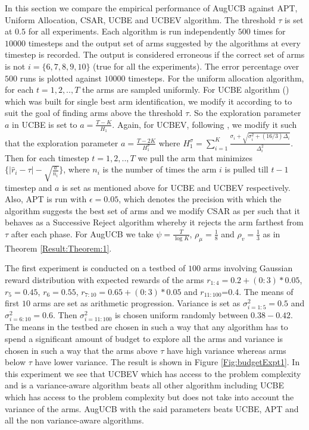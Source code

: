 	In this section we compare the empirical performance of AugUCB against APT, Uniform Allocation, CSAR, UCBE and UCBEV algorithm. The threshold $\tau$ is set at $0.5$ for all experiments. Each algorithm is run independently $500$ times for $10000$ timesteps and the output set of arms suggested by the algorithms at every timestep is recorded. The output is considered erroneous if the correct set of arms is not $i=\lbrace 6,7,8,9,10 \rbrace$ (true for all the experiments). The error percentage over $500$ runs is plotted against $10000$ timesteps. For the uniform allocation algorithm, for each $t=1,2,..,T$ the arms are sampled uniformly. For UCBE algorithm (\cite{audibert2009exploration}) which was built for single best arm identification, we modify it according to \cite{locatelli2016optimal} to suit the goal of finding arms above the threshold $\tau$. So the exploration parameter $a$ in UCBE is set to $a=\frac{T-K}{H_1}$. Again, for UCBEV, following \cite{gabillon2011multi}, we modify it such that the exploration parameter $a = \frac{T-2K}{H_{1}^{\sigma}}$ where $H_{1}^{\sigma}=\sum_{i=1}^{K}\frac{\sigma_{i}+\sqrt{\sigma_{i}^{2}+(16/3)\Delta_{i}}}{\Delta_{i}^{2}}$. Then for each timestep $t=1,2,..,T$ we pull the arm that minimizes $\lbrace |\hat{r}_{i} -\tau|-\sqrt{\frac{a}{n_{i}}} \rbrace$, where $n_{i}$ is the number of times the arm $i$ is pulled till $t-1$ timestep and $a$ is set as mentioned above for UCBE and UCBEV respectively. Also, APT is run with $\epsilon=0.05$, which denotes the precision with which the algorithm suggests the best set of arms and we modify CSAR as per \cite{locatelli2016optimal} such that it behaves as a Successive Reject algorithm whereby it rejects the arm farthest from $\tau$ after each phase. For AugUCB we take $\psi=\frac{T}{\log K}$, $\rho_{\mu}=\frac{1}{8}$ and $\rho_v=\frac{1}{3}$ as in Theorem \ref{Result:Theorem:1}.
	
	The first experiment is conducted on a testbed of $100$ arms involving Gaussian reward distribution with expected rewards of the arms $r_{1:4}=0.2+(0:3)*0.05$, $r_{5}=0.45$, $r_{6}=0.55$, $r_{7:10}=0.65+(0:3)*0.05$ and $r_{11:100}$=0.4. The means of first $10$ arms are set as arithmetic progression. Variance is set as $\sigma_{i=1:5}^{2}=0.5$ and $\sigma_{i=6:10}^{2}=0.6$. Then $\sigma_{i=11:100}^{2}$ is chosen uniform randomly between $0.38-0.42$. The means in the testbed are chosen in such a way that any algorithm has to spend a significant amount of budget to explore all the arms and variance is chosen in such a way that the arms above $\tau$ have high variance whereas arms below $\tau$ have lower variance. The result is shown in Figure \ref{Fig:budgetExpt1}. In this experiment we see that UCBEV which has access to the problem complexity and is a variance-aware algorithm beats all other algorithm including UCBE which has access to the problem complexity but does not take into account the variance of the arms. AugUCB with the said parameters beats UCBE, APT and all the non variance-aware algorithms. 
	
